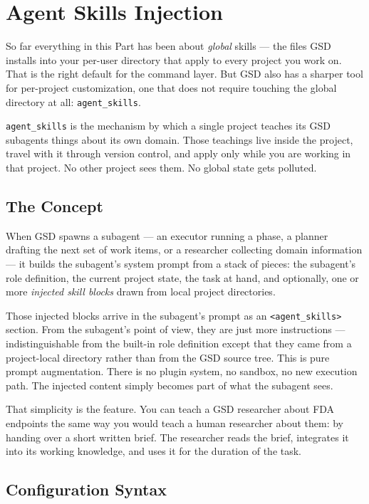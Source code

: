 \documentclass[11pt,letterpaper,openany]{book}
\begin{document}
\chapter{Agent Skills Injection}

So far everything in this Part has been about \emph{global} skills --- the
files GSD installs into your per-user directory that apply to every
project you work on. That is the right default for the command layer.
But GSD also has a sharper tool for per-project customization, one that
does not require touching the global directory at all: \texttt{agent\_skills}.

\texttt{agent\_skills} is the mechanism by which a single project teaches
its GSD subagents things about its own domain. Those teachings live
inside the project, travel with it through version control, and apply
only while you are working in that project. No other project sees them.
No global state gets polluted.

\section{The Concept}

When GSD spawns a subagent --- an executor running a phase, a planner
drafting the next set of work items, or a researcher collecting
domain information --- it builds the subagent's system prompt from a
stack of pieces: the subagent's role definition, the current project
state, the task at hand, and optionally, one or more
\emph{injected skill blocks} drawn from local project directories.

Those injected blocks arrive in the subagent's prompt as an
\texttt{<agent\_skills>} section. From the subagent's point of view,
they are just more instructions --- indistinguishable from the built-in
role definition except that they came from a project-local directory
rather than from the GSD source tree. This is pure prompt augmentation.
There is no plugin system, no sandbox, no new execution path. The
injected content simply becomes part of what the subagent sees.

That simplicity is the feature. You can teach a GSD researcher about
FDA endpoints the same way you would teach a human researcher about
them: by handing over a short written brief. The researcher reads the
brief, integrates it into its working knowledge, and uses it for the
duration of the task.

\section{Configuration Syntax}
\end{document}
